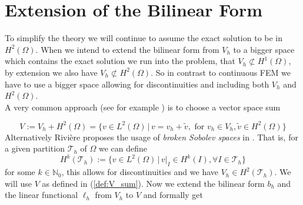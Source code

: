 \section{Extension of the Bilinear Form}
To simplify the theory we will continue to assume the exact solution to be in $H^2(\Omega)$. 
When we intend to extend the bilinear form from $V_h$ to a bigger space which contains the exact solution we run into the problem, that $V_h \not \subset H^1(\Omega)$, 
by extension we also have $V_h \not \subset H^2(\Omega)$. So in contrast to continuous FEM we have to use a bigger space allowing for discontinuities and including both 
$V_h$ and $H^2(\Omega)$. \\
A very common approach (see for example \cite{georgoulis2011Springer}) is to choose a vector space sum 

\begin{equation}
    \label{def:V_sum}
    V:= V_h + H^2(\Omega) = \{ v \in L^2(\Omega) \, |\, v = v_h + \tilde{v}, \text{ for } v_h \in V_h, \tilde{v} \in H^2(\Omega)\}
\end{equation}
Alternatively Rivière proposes the usage of \textit{broken Sobolev spaces} in \cite{riviere2008}. That is, for a given partition $\mathcal{T}_h$ of $\Omega$ 
we can define 
\begin{equation*}
    H^k(\mathcal{T}_h) := \{ v \in L^2(\Omega) \,| \, v \vert_I \in H^k(I), \forall I \in \mathcal{T}_h \}
\end{equation*} 
for some $k \in \mathbb{N}_0$, this allows for discontinuities and we have $V_h \in H^2(\mathcal{T}_h)$. We will use $V$ as defined in (\ref{def:V_sum}).
Now we extend the bilinear form $b_h$ and the linear functional $\ell_h$ from $V_h$ to $V$ and formally get

